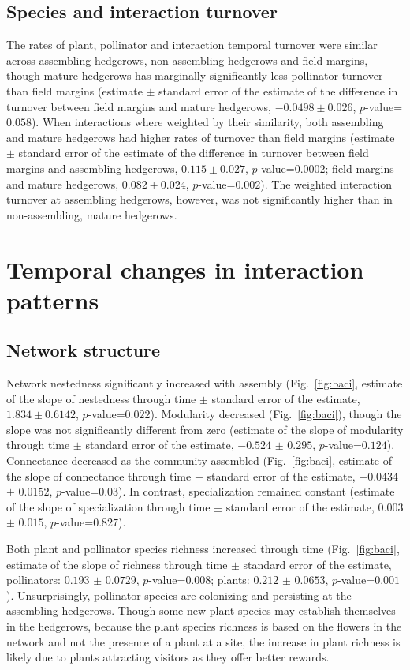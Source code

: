\documentclass[12pt]{article}
\begin{document}
\subsection*{Species and interaction turnover}
The rates of plant, pollinator and interaction temporal turnover were
similar across assembling hedgerows, non-assembling hedgerows and
field margins, though mature hedgerows has marginally significantly
less pollinator turnover than field margins (estimate $\pm$ standard
error of the estimate of the difference in turnover between field
margins and mature hedgerows, $-0.0498 \pm 0.026$,
$p$-value=$0.058$). When interactions where weighted by their
similarity, both assembling and mature hedgerows had higher rates of
turnover than field margins (estimate $\pm$ standard error of the
estimate of the difference in turnover between field margins and
assembling hedgerows, $0.115 \pm 0.027$, $p$-value=$0.0002$; field
margins and mature hedgerows, $0.082 \pm 0.024$,
$p$-value=$0.002$). The weighted interaction turnover at assembling
hedgerows, however, was not significantly higher than in
non-assembling, mature hedgerows.


\section*{Temporal changes in interaction patterns}
\subsection*{Network structure}
Network nestedness significantly increased with assembly
(Fig.~\ref{fig:baci}, estimate of the slope of nestedness through time
$\pm$ standard error of the estimate, $1.834 \pm 0.6142$,
$p$-value=$0.022$). Modularity decreased (Fig.~\ref{fig:baci}),
though the slope was not significantly different from zero (estimate
of the slope of modularity through time $\pm$ standard error of the
estimate, $-0.524$ $\pm$ $0.295$, $p$-value=$0.124$). Connectance
decreased as the community assembled (Fig.~\ref{fig:baci}, estimate of
the slope of connectance through time $\pm$ standard error of the
estimate, $-0.0434$ $\pm$ $0.0152$, $p$-value=$0.03$). In contrast,
specialization remained constant (estimate of the slope of
specialization through time $\pm$ standard error of the estimate,
$0.003$ $\pm$ $0.015$, $p$-value=$0.827$).

Both plant and pollinator species richness increased through time
(Fig.~\ref{fig:baci}, estimate of the slope of richness through time
$\pm$ standard error of the estimate, pollinators: $0.193$ $\pm$
$0.0729$, $p$-value=$0.008$; plants: $0.212$ $\pm$ $0.0653$,
$p$-value=$0.001$). Unsurprisingly, pollinator species are colonizing
and persisting at the assembling hedgerows. Though some new plant
species may establish themselves in the hedgerows, because the plant
species richness is based on the flowers in the network and not the
presence of a plant at a site, the increase in plant richness is
likely due to plants attracting visitors as they offer better rewards.
\end{document}
